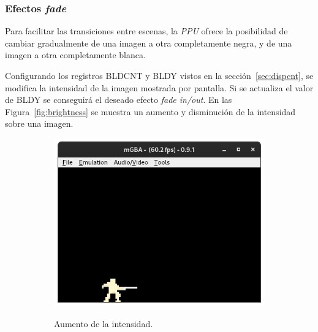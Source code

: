 \subsubsection{Efectos \textit{fade}}\label{sec:efectos_fade}
Para facilitar las transiciones entre escenas, la \textit{PPU} ofrece la posibilidad de cambiar gradualmente de una imagen a otra completamente negra, y de una imagen a otra completamente blanca. 

Configurando los registros BLDCNT y BLDY vistos en la sección~\ref{sec:dispcnt}, se modifica la intensidad de la imagen mostrada por pantalla. Si se actualiza el valor de BLDY se conseguirá el deseado efecto \textit{fade in/out}. En las Figura~\ref{fig:brightness} se muestra un aumento y disminución de la intensidad sobre una imagen. 

\begin{figure}[h]
     \centering
     \begin{subfigure}[b]{0.45\textwidth}
         \centering
         \includegraphics[width=\textwidth]{capitulos/capitulo3/brightness_3.png}
         \label{fig:blending_1}
	     \caption{Aumento de la intensidad.}
     \end{subfigure}
     \hfill
     \begin{subfigure}[b]{0.45\textwidth}
         \centering

\end{subfigure}
\end{figure}
